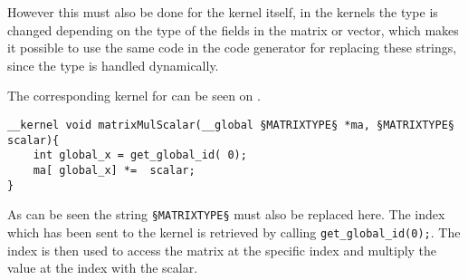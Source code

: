 However this must also be done for the kernel itself, in the kernels the type is changed depending on the type of the fields in the matrix or vector, which makes it possible to use the same code in the code generator for replacing these strings, since the type is handled dynamically.

The corresponding kernel for  can be seen on .
\begin{lstlisting}[caption=Kernel code for multiplying a matrix or vector with a scalar.,numbers=none,frame=tlrb,label={lst:kernel}]
__kernel void matrixMulScalar(__global §MATRIXTYPE§ *ma, §MATRIXTYPE§ scalar){
	int global_x = get_global_id( 0);
	ma[ global_x] *=  scalar;
}
\end{lstlisting}

As can be seen the string \texttt{§MATRIXTYPE§} must also be replaced here.
The index which has been sent to the kernel is retrieved by calling \texttt{get\_global\_id(0);}.
The index is then used to access the matrix at the specific index and multiply the value at the index with the scalar.

